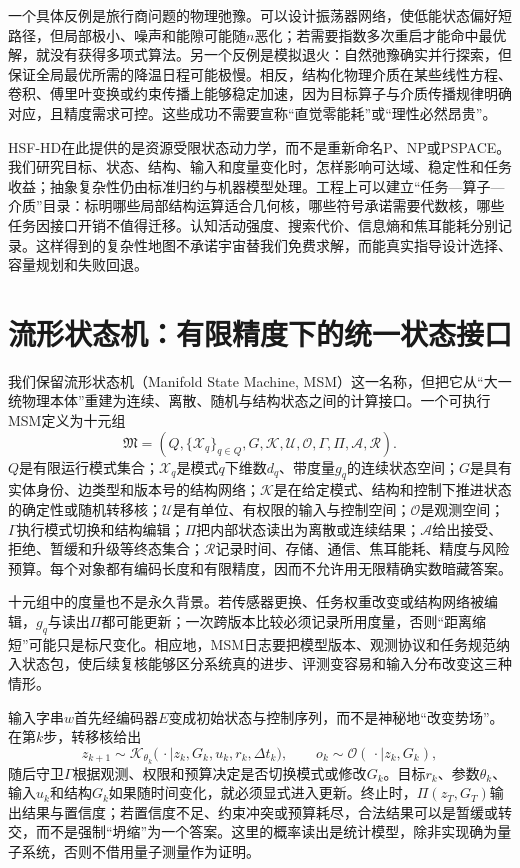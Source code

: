 一个具体反例是旅行商问题的物理弛豫。可以设计振荡器网络，使低能状态偏好短路径，但局部极小、噪声和能隙可能随$n$恶化；若需要指数多次重启才能命中最优解，就没有获得多项式算法。另一个反例是模拟退火：自然弛豫确实并行探索，但保证全局最优所需的降温日程可能极慢。相反，结构化物理介质在某些线性方程、卷积、傅里叶变换或约束传播上能够稳定加速，因为目标算子与介质传播规律明确对应，且精度需求可控。这些成功不需要宣称“直觉零能耗”或“理性必然昂贵”。

HSF-HD在此提供的是资源受限状态动力学，而不是重新命名P、NP或PSPACE。我们研究目标、状态、结构、输入和度量变化时，怎样影响可达域、稳定性和任务收益；抽象复杂性仍由标准归约与机器模型处理。工程上可以建立“任务—算子—介质”目录：标明哪些局部结构运算适合几何核，哪些符号承诺需要代数核，哪些任务因接口开销不值得迁移。认知活动强度、搜索代价、信息熵和焦耳能耗分别记录。这样得到的复杂性地图不承诺宇宙替我们免费求解，而能真实指导设计选择、容量规划和失败回退。

\section{流形状态机：有限精度下的统一状态接口}
\label{sec:manifold_state_machine}

我们保留流形状态机（Manifold State Machine, MSM）这一名称，但把它从“大一统物理本体”重建为连续、离散、随机与结构状态之间的计算接口。一个可执行MSM定义为十元组
\[
\mathfrak M=(Q,\{\mathcal X_q\}_{q\in Q},G,\mathcal K,
\mathcal U,\mathcal O,\Gamma,\Pi,\mathcal A,\mathcal R).
\]
$Q$是有限运行模式集合；$\mathcal X_q$是模式$q$下维数$d_q$、带度量$g_q$的连续状态空间；$G$是具有实体身份、边类型和版本号的结构网络；$\mathcal K$是在给定模式、结构和控制下推进状态的确定性或随机转移核；$\mathcal U$是有单位、有权限的输入与控制空间；$\mathcal O$是观测空间；$\Gamma$执行模式切换和结构编辑；$\Pi$把内部状态读出为离散或连续结果；$\mathcal A$给出接受、拒绝、暂缓和升级等终态集合；$\mathcal R$记录时间、存储、通信、焦耳能耗、精度与风险预算。每个对象都有编码长度和有限精度，因而不允许用无限精确实数暗藏答案。

十元组中的度量也不是永久背景。若传感器更换、任务权重改变或结构网络被编辑，$g_q$与读出$\Pi$都可能更新；一次跨版本比较必须记录所用度量，否则“距离缩短”可能只是标尺变化。相应地，MSM日志要把模型版本、观测协议和任务规范纳入状态包，使后续复核能够区分系统真的进步、评测变容易和输入分布改变这三种情形。

输入字串$w$首先经编码器$E$变成初始状态与控制序列，而不是神秘地“改变势场”。在第$k$步，转移核给出
\[
z_{k+1}\sim
\mathcal K_{\theta_k}
\bigl(\,\cdot\mid z_k,G_k,u_k,r_k,\Delta t_k\bigr),
\qquad
o_k\sim\mathcal O(\,\cdot\mid z_k,G_k),
\]
随后守卫$\Gamma$根据观测、权限和预算决定是否切换模式或修改$G_k$。目标$r_k$、参数$\theta_k$、输入$u_k$和结构$G_k$如果随时间变化，就必须显式进入更新。终止时，$\Pi(z_T,G_T)$输出结果与置信度；若置信度不足、约束冲突或预算耗尽，合法结果可以是暂缓或转交，而不是强制“坍缩”为一个答案。这里的概率读出是统计模型，除非实现确为量子系统，否则不借用量子测量作为证明。

